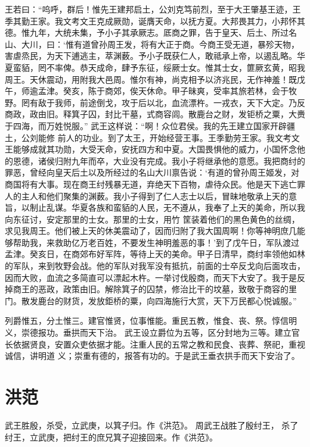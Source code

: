 \documentclass[12pt,UTF8]{ctexbook}
\begin{document}
王若曰：“呜呼，群后！惟先王建邦启土，公刘克笃前烈，至于大王肇基王迹，王季其勤王家。我文考文王克成厥勋，诞膺天命，以抚方夏。大邦畏其力，小邦怀其德。惟九年，大统未集，予小子其承厥志。厎商之罪，告于皇天、后土、所过名山、大川，曰：‘惟有道曾孙周王发，将有大正于商。今商王受无道，暴殄天物，害虐烝民，为天下逋逃主，萃渊薮。予小子既获仁人，敢祗承上帝，以遏乱略。华夏蛮貊，罔不率俾。恭天成命，肆予东征，绥厥士女。惟其士女，篚厥玄黄，昭我周王。天休震动，用附我大邑周。惟尔有神，尚克相予以济兆民，无作神羞！既戊午，师逾孟津。癸亥，陈于商郊，俟天休命。甲子昧爽，受率其旅若林，会于牧野。罔有敌于我师，前途倒戈，攻于后以北，血流漂杵。一戎衣，天下大定。乃反商政，政由旧。释箕子囚，封比干墓，式商容闾。散鹿台之财，发钜桥之粟，大赉于四海，而万姓悦服。”
武王这样说：“啊！众位君侯。我的先王建立国家开辟疆土，公刘能修 前人的功业。到了太王，开始经营王事。王季勤劳王家。我文考文王能够成就其功勋，大受天命，安抚四方和中夏。大国畏惧他的威力，小国怀念他的恩德，诸侯归附九年而卒，大业没有完成。我小子将继承他的意愿。我把商纣的罪恶，曾经向皇天后土以及所经过的名山大川禀告说：‘有道的曾孙周王姬发，对商国将有大事。现在商王纣残暴无道，弃绝天下百物，虐待众民。他是天下逃亡罪人的主人和他们聚集的渊薮。我小子得到了仁人志士以后，冒昧地敬承上天的意旨，以制止乱谋。华夏各族和蛮貊的人民，无不遵从，我奉了上天的美命，所以我向东征讨，安定那里的士女。那里的士女，用竹 筐装着他们的黑色黄色的丝绸，求见我周王。他们被上天的休美震动了，因而归附了我大国周啊！你等神明庶几能够帮助我，来救助亿万老百姓，不要发生神明羞恶的事！’到了戊午日，军队渡过孟津。癸亥日，在商郊布好军阵，等待上天的美命。甲子日清早，商纣率领他如林的军队，来到牧野会战。他的军队对我军没有抵抗，前面的士卒反戈向后面攻击，因而大败，血流之多简直可以漂起木杵。一举讨伐殷商，而天下大安了。我于是反掉商王的恶政，政策由旧。解除箕子的囚禁，修治比干的坟墓，致敬于商容的里门。散发鹿台的财货，发放鉅桥的粟，向四海施行大赏，天下万民都心悦诚服。”

列爵惟五，分土惟三。建官惟贤，位事惟能。重民五教，惟食、丧、祭。惇信明义，崇德报功。垂拱而天下治。
武王设立爵位为五等，区分封地为三等。建立官长依据贤良，安置众吏依据才能。注重人民的五常之教和民食、丧葬、祭祀，重视诚信，讲明道 义；崇重有德的，报答有功的。于是武王垂衣拱手而天下安治了。

\chapter{洪范}

武王胜殷，杀受，立武庚，以箕子归。作《洪范》。
周武王战胜了殷纣王， 杀了纣王，立武庚，把纣王的庶兄箕子迎接回来。作《洪范》。
\end{document}
